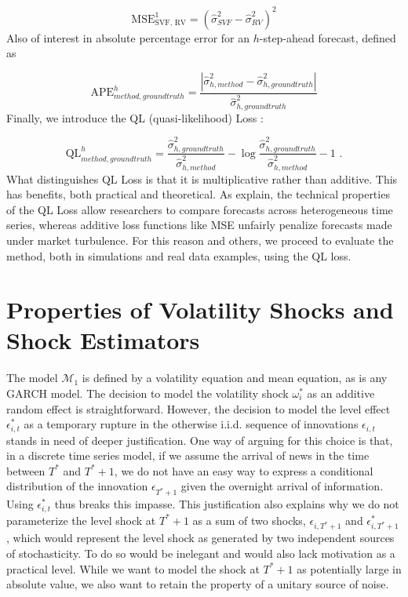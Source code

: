 \documentclass[11pt,3p,review,authoryear]{elsarticle}
\def\mc#1{\mathcal{#1}} %
\def\mc#1{\mathcal{#1}}
\theoremstyle{definition}
\begin{document}
$$ \text{MSE}^{1}_{\text{SVF, RV}} = (\hat\sigma^{2}_{SVF} - \hat\sigma^{2}_{RV})^{2}$$
Also of interest in absolute percentage error for an $h$-step-ahead forecast, defined as

\[ 
\text{APE}^{h}_{method, ground truth} = \frac{|\hat\sigma^{2}_{h, method} - \hat\sigma^{2}_{h, ground truth}|}{\hat\sigma^{2}_{h, ground truth}}
\]
Finally, we introduce the QL (quasi-likelihood) Loss \citep{brownlees2011practical}:

\[ 
\text{QL}^{h}_{method, ground truth} = \frac{\hat\sigma^{2}_{h, ground truth}}{ \hat\sigma^{2}_{h, method}} - \log{\frac{\hat\sigma^{2}_{h, ground truth}}{ \hat\sigma^{2}_{h, method}}} -1 \text{ .}
\]
What distinguishes QL Loss is that it is multiplicative rather than additive.  This has benefits, both practical and theoretical.  As \citet{brownlees2011practical} explain, the technical properties of the QL Loss allow researchers to compare forecasts across heterogeneous time series, whereas additive loss functions like MSE unfairly penalize forecasts made under market turbulence.  For this reason and others, we proceed to evaluate the method, both in simulations and real data examples, using the QL loss.

\section{Properties of Volatility Shocks and Shock Estimators}\label{SVF_properties}

The model $\mc{M}_1$ is defined by a volatility equation and mean equation, as is any GARCH model.  The decision to model the volatility shock $\omega^{*}_{i}$ as an additive random effect is straightforward.  However, the decision to model the level effect $\epsilon^{*}_{i,t}$ as a temporary rupture in the otherwise i.i.d. sequence of innovations $\epsilon_{i,t}$ stands in need of deeper justification.  One way of arguing for this choice is that, in a discrete time series model, if we assume the arrival of news in the time between $T^{*}$ and $T^{*}+1$, we do not have an easy way to express a conditional distribution of the innovation $\epsilon_{T^{*}+1}$ given the overnight arrival of information.  Using $\epsilon^{*}_{i,t}$ thus breaks this impasse.  This justification also explains why we do not parameterize the level shock at $T^{*}+1$ as a sum of two shocks, $\epsilon_{i,T^{*}+1}$ and $\epsilon^{*}_{i,T^{*}+1}$, which would represent the level shock as generated by two independent sources of stochasticity.  To do so would be inelegant and would also lack motivation as a practical level.  While we want to model the shock at $T^{*}+1$ as potentially large in absolute value, we also want to retain the property of a unitary source of noise.
\end{document}
